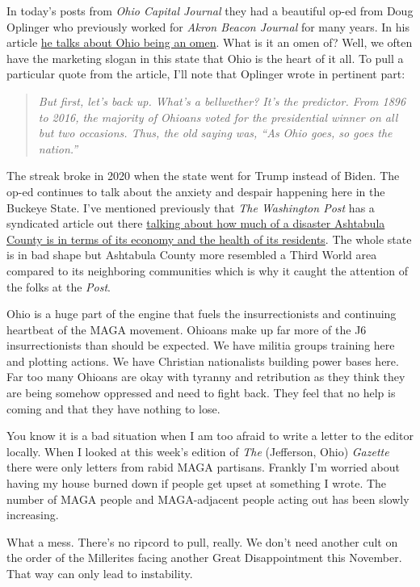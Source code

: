 In today's posts from \emph{Ohio Capital Journal} they had a beautiful
op-ed from Doug Oplinger who previously worked for \emph{Akron Beacon
Journal} for many years. In his article
\href{https://web.archive.org/web/20240424184708/https://ohiocapitaljournal.com/2024/04/24/for-whom-the-bellwether-tolls-is-ohio-an-omen/}{he
talks about Ohio being an omen}. What is it an omen of? Well, we often
have the marketing slogan in this state that Ohio is the heart of it
all. To pull a particular quote from the article, I'll note that
Oplinger wrote in pertinent part:

\begin{quote}
\emph{But first, let's back up. What's a bellwether? It's the predictor.
From 1896 to 2016, the majority of Ohioans voted for the presidential
winner on all but two occasions. Thus, the old saying was, ``As Ohio
goes, so goes the nation.''}
\end{quote}

The streak broke in 2020 when the state went for Trump instead of Biden.
The op-ed continues to talk about the anxiety and despair happening here
in the Buckeye State. I've mentioned previously that \emph{The
Washington Post} has a syndicated article out there
\href{https://web.archive.org/web/20240105093608/https://www.unionleader.com/news/health/how-red-state-politics-are-shaving-years-off-american-lives/article_a15969c1-6959-526b-91d2-9d1c966c15fd.html}{talking
about how much of a disaster Ashtabula County is in terms of its economy
and the health of its residents}. The whole state is in bad shape but
Ashtabula County more resembled a Third World area compared to its
neighboring communities which is why it caught the attention of the
folks at the \emph{Post}.

Ohio is a huge part of the engine that fuels the insurrectionists and
continuing heartbeat of the MAGA movement. Ohioans make up far more of
the J6 insurrectionists than should be expected. We have militia groups
training here and plotting actions. We have Christian nationalists
building power bases here. Far too many Ohioans are okay with tyranny
and retribution as they think they are being somehow oppressed and need
to fight back. They feel that no help is coming and that they have
nothing to lose.

You know it is a bad situation when I am too afraid to write a letter to
the editor locally. When I looked at this week's edition of \emph{The}
(Jefferson, Ohio) \emph{Gazette} there were only letters from rabid MAGA
partisans. Frankly I'm worried about having my house burned down if
people get upset at something I wrote. The number of MAGA people and
MAGA-adjacent people acting out has been slowly increasing.

What a mess. There's no ripcord to pull, really. We don't need another
cult on the order of the Millerites facing another Great Disappointment
this November. That way can only lead to instability.
